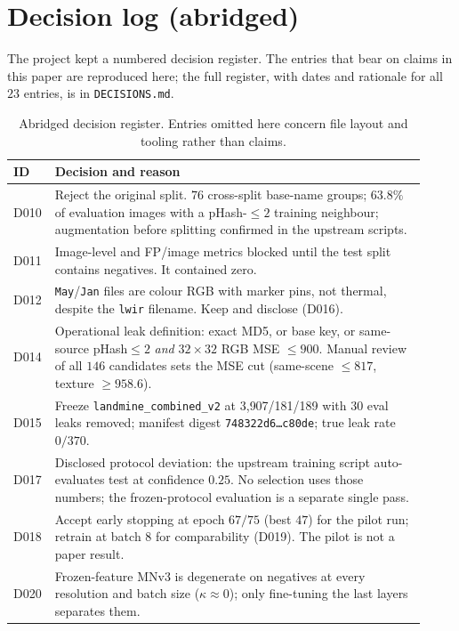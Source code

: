 \section{Decision log (abridged)}
\label{app:decisions}

The project kept a numbered decision register. The entries that bear on claims in
this paper are reproduced here; the full register, with dates and rationale for
all $23$ entries, is in \texttt{DECISIONS.md}.

\begin{table}[t]
\centering
\small
\caption{Abridged decision register. Entries omitted here concern file layout and
tooling rather than claims.}
\label{tab:decisions}
\setlength{\tabcolsep}{4pt}
\begin{tabular}{@{}p{0.055\linewidth}p{0.86\linewidth}@{}}
\toprule
ID & Decision and reason \\
\midrule
D010 & Reject the original split. $76$ cross-split base-name groups; $63.8\%$
of evaluation images with a pHash-$\le2$ training neighbour; augmentation before
splitting confirmed in the upstream scripts. \\
D011 & Image-level and FP/image metrics blocked until the test split contains
negatives. It contained zero. \\
D012 & \texttt{May}/\texttt{Jan} files are colour RGB with marker pins, not
thermal, despite the \texttt{lwir} filename. Keep and disclose (D016). \\
D014 & Operational leak definition: exact MD5, or base key, or same-source
pHash$\le2$ \emph{and} $32\times32$ RGB MSE $\le 900$. Manual review of all $146$
candidates sets the MSE cut (same-scene $\le 817$, texture $\ge 958.6$). \\
D015 & Freeze \texttt{landmine\_combined\_v2} at 3{,}907/181/189 with $30$ eval
leaks removed; manifest digest \texttt{748322d6\ldots c80de}; true leak rate
$0/370$. \\
D017 & Disclosed protocol deviation: the upstream training script auto-evaluates
test at confidence $0.25$. No selection uses those numbers; the frozen-protocol
evaluation is a separate single pass. \\
D018 & Accept early stopping at epoch $67/75$ (best $47$) for the pilot run;
retrain at batch $8$ for comparability (D019). The pilot is not a paper result. \\
D020 & Frozen-feature MNv3 is degenerate on negatives at every resolution and
batch size ($\kappa \approx 0$); only fine-tuning the last layers separates them.

\end{tabular}
\end{table}
